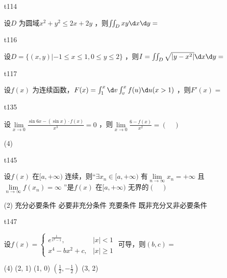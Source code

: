 \begin{question}
    t114

    设$ D $ 为圆域$ x^2 + y^2 \le 2x + 2y $ ，则$ \iint_D xy\d x \d y = $ 
\end{question}

\begin{question}
    t116

    设$ D = \{(x,y) | -1 \le x \le 1, 0 \le y \le 2\} $ ，则$ I = \iint_D \sqrt{\abs{y - x^2}} \d x\d y = $ 
\end{question}

\begin{question}
    t117

    设$ f(x) $ 为连续函数，$ F(x) = \int_{1}^{x} \d v \int_{v}^{x} f(u) \d u (x > 1) $ ，则$ F'(x) =  $ 
\end{question}

\begin{question}
    t135

    设$ \lim\limits_{x \to 0} \frac{\sin 6x - (\sin x)\cdot f(x)}{x^3} = 0 $ ，则$ \lim\limits_{x \to 0} \frac{6 - f(x)}{x^2} = (\quad) $
    \begin{tasks}(4)
        \task   \infty
    \end{tasks} 
\end{question}

\begin{question}
    t145

    设$ f(x) $ 在$ [a,+\infty) $ 连续，则“$ \exists x_n \in [a,+\infty) $ 有$ \lim\limits_{n \to \infty} x_n = +\infty $ 且$ \lim\limits_{n \to \infty} f(x_n) = \infty $ ”是$ f(x) $ 在$ [a,+\infty) $ 无界的$ (\quad) $ 
    \begin{tasks}(2)
        \task   充分必要条件
        \task   必要非充分条件
        \task   充要条件
        \task   既非充分又非必要条件
    \end{tasks}
\end{question}

\begin{question}
    t147

    设$ f(x) =\begin{cases}
        e^{\frac{1}{x^2 - 1}}, &|x| < 1 \\
        x^4 - bx^2 + c, &|x| \ge 1
    \end{cases} $ 可导，则$ (b, c) = $
    \begin{tasks}(4)
        \task (2, 1)
        \task (1, 0)
        \task $ ( \frac 1 2  , -\frac 1 2) $
        \task (3, 2)
    \end{tasks} 
\end{question}

